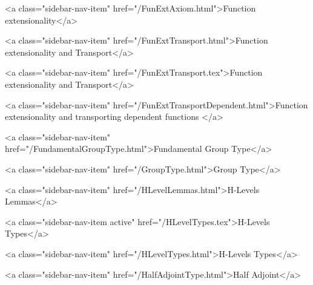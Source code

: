       
    
      
        
          <a class="sidebar-nav-item" href="/FunExtAxiom.html">Function extensionality</a>
        
      
    
      
        
          <a class="sidebar-nav-item" href="/FunExtTransport.html">Function extensionality and Transport</a>
        
      
    
      
        
          <a class="sidebar-nav-item" href="/FunExtTransport.tex">Function extensionality and Transport</a>
        
      
    
      
        
          <a class="sidebar-nav-item" href="/FunExtTransportDependent.html">Function extensionality and transporting dependent functions </a>
        
      
    
      
        
          <a class="sidebar-nav-item" href="/FundamentalGroupType.html">Fundamental Group Type</a>
        
      
    
      
        
          <a class="sidebar-nav-item" href="/GroupType.html">Group Type</a>
        
      
    
      
        
          <a class="sidebar-nav-item" href="/HLevelLemmas.html">H-Levels Lemmas</a>
        
      
    
      
        
          <a class="sidebar-nav-item active" href="/HLevelTypes.tex">H-Levels Types</a>
        
      
    
      
        
          <a class="sidebar-nav-item" href="/HLevelTypes.html">H-Levels Types</a>
        
      
    
      
        
          <a class="sidebar-nav-item" href="/HalfAdjointType.html">Half Adjoint</a>
        
      
    
      
        
